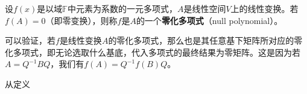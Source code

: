
\begin{definition}{}
设$f(x)$是以域$\mathbb F$中元素为系数的一元多项式，$A$是线性空间$V$上的线性变换。若$f(A)=0$（即零变换），则称$f$是$A$的一个\textbf{零化多项式}（null polynomial）。
\end{definition}
可以验证，若$f$是线性变换$A$的零化多项式，那么也是其任意基下矩阵所对应的零化多项式，即无论选取什么基底，代入多项式的最终结果为零矩阵。这是因为若$A=Q^{-1}BQ$，我们有$f(A)=Q^{-1}f(B)Q$。

从定义
